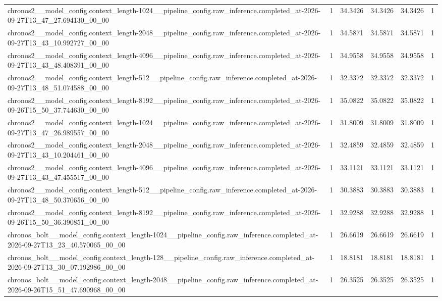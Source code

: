 \begin{tabular}{llllll}
chronos2\_\_model\_config.context\_length-1024\_\_pipeline\_config.raw\_inference.completed\_at-2026-09-27T13\_47\_27.694130\_00\_00 & 1 & 34.3426 & 34.3426 & 34.3426 & 1 \\
chronos2\_\_model\_config.context\_length-2048\_\_pipeline\_config.raw\_inference.completed\_at-2026-09-27T13\_43\_10.992727\_00\_00 & 1 & 34.5871 & 34.5871 & 34.5871 & 1 \\
chronos2\_\_model\_config.context\_length-4096\_\_pipeline\_config.raw\_inference.completed\_at-2026-09-27T13\_43\_48.408391\_00\_00 & 1 & 34.9558 & 34.9558 & 34.9558 & 1 \\
chronos2\_\_model\_config.context\_length-512\_\_pipeline\_config.raw\_inference.completed\_at-2026-09-27T13\_48\_51.074588\_00\_00 & 1 & 32.3372 & 32.3372 & 32.3372 & 1 \\
chronos2\_\_model\_config.context\_length-8192\_\_pipeline\_config.raw\_inference.completed\_at-2026-09-26T15\_50\_37.744630\_00\_00 & 1 & 35.0822 & 35.0822 & 35.0822 & 1 \\
chronos2\_\_model\_config.context\_length-1024\_\_pipeline\_config.raw\_inference.completed\_at-2026-09-27T13\_47\_26.989557\_00\_00 & 1 & 31.8009 & 31.8009 & 31.8009 & 1 \\
chronos2\_\_model\_config.context\_length-2048\_\_pipeline\_config.raw\_inference.completed\_at-2026-09-27T13\_43\_10.204461\_00\_00 & 1 & 32.4859 & 32.4859 & 32.4859 & 1 \\
chronos2\_\_model\_config.context\_length-4096\_\_pipeline\_config.raw\_inference.completed\_at-2026-09-27T13\_43\_47.455517\_00\_00 & 1 & 33.1121 & 33.1121 & 33.1121 & 1 \\
chronos2\_\_model\_config.context\_length-512\_\_pipeline\_config.raw\_inference.completed\_at-2026-09-27T13\_48\_50.370656\_00\_00 & 1 & 30.3883 & 30.3883 & 30.3883 & 1 \\
chronos2\_\_model\_config.context\_length-8192\_\_pipeline\_config.raw\_inference.completed\_at-2026-09-26T15\_50\_36.390851\_00\_00 & 1 & 32.9288 & 32.9288 & 32.9288 & 1 \\
chronos\_bolt\_\_model\_config.context\_length-1024\_\_pipeline\_config.raw\_inference.completed\_at-2026-09-27T13\_23\_40.570065\_00\_00 & 1 & 26.6619 & 26.6619 & 26.6619 & 1 \\
chronos\_bolt\_\_model\_config.context\_length-128\_\_pipeline\_config.raw\_inference.completed\_at-2026-09-27T13\_30\_07.192986\_00\_00 & 1 & 18.8181 & 18.8181 & 18.8181 & 1 \\
chronos\_bolt\_\_model\_config.context\_length-2048\_\_pipeline\_config.raw\_inference.completed\_at-2026-09-26T15\_51\_47.690968\_00\_00 & 1 & 26.3525 & 26.3525 & 26.3525 & 1 \\

\end{tabular}
